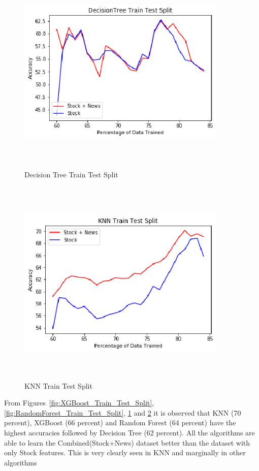 \documentclass[preprint,12pt]{elsarticle}
\begin{document}
\begin{figure}[H]
\centering
\includegraphics[width=10cm,height=10cm,keepaspectratio]{DecisionTree_Grid_Search_Acc.eps}
\caption{\label{fig:DecisionTree_Train_Test_Split} Decision Tree Train Test Split}
\end{figure}

\begin{figure}[H]
\centering
\includegraphics[width=10cm,height=10cm,keepaspectratio]{KNN_Grid_Search_Acc.eps}
\caption{\label{fig:KNN_Train_Test_Split} KNN Train Test Split}
\end{figure}

From Figures~\ref{fig:XGBoost_Train_Test_Split}, \ref{fig:RandomForest_Train_Test_Split}, \ref{fig:DecisionTree_Train_Test_Split} and  \ref{fig:KNN_Train_Test_Split} it is observed that KNN (70 percent), XGBoost (66 percent) and Random Forest (64 percent) have the highest accuracies followed by Decision Tree (62 percent). All the algorithms are able to learn the Combined(Stock+News) dataset better than the dataset with only Stock features. This is very clearly seen in KNN and marginally in other algorithms
\end{document}
